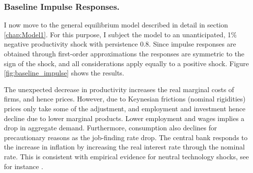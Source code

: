 \subsubsection{Baseline Impulse Responses.}
I now move to the general equilibrium model described in detail in section \ref{chap:Model1}. For this purpose, I subject the model to an unanticipated, 1\% negative productivity shock with persistence 0.8. Since impulse responses are obtained through first-order approximations the responses are symmetric to the sign of the shock, and all considerations apply equally to a positive shock. Figure \ref{fig:baseline_impulse} shows the results. 

The unexpected decrease in productivity increases the real marginal costs of firms, and hence prices. However, due to Keynesian frictions (nominal rigidities) prices only take some of the adjustment, and employment and investment hence decline due to lower marginal products. Lower employment and wages implies a drop in aggregate demand. Furthermore, consumption also declines for precautionary reasons as the job-finding rate drop. The central bank responds to the increase in inflation by increasing the real interest rate through the nominal rate. This is consistent with empirical evidence for neutral technology shocks, see for instance \citet{christiano2016unemployment}. 


